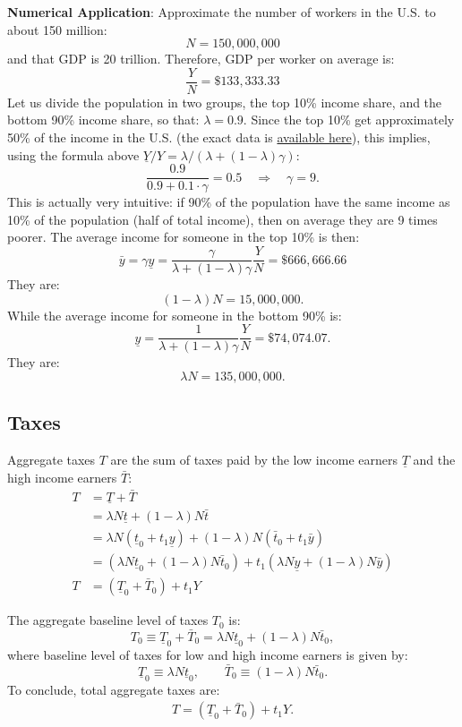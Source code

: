 \documentclass[]{book}
\begin{document}
\textbf{Numerical Application}: Approximate the number of workers in the
U.S. to about 150 million: \[N = 150,000,000\] and that GDP is 20
trillion. Therefore, GDP per worker on average is:
\[\frac{Y}{N}=\$133,333.33\] Let us divide the population in two groups,
the top 10\% income share, and the bottom 90\% income share, so that:
\(\lambda = 0.9\). Since the top 10\% get approximately 50\% of the
income in the U.S. (the exact data is
\href{https://wid.world/world/\#sptinc_p90p100_z/US;FR;DE;CN;ZA;GB;WO/last/eu/k/p/yearly/s/false/25.253500000000003/80/curve/false/country}{available
here}), this implies, using the formula above
\(\underline{Y}/Y=\lambda/\left(\lambda +(1-\lambda)\gamma\right)\):
\[\frac{0.9}{0.9+0.1\cdot \gamma}=0.5 \quad \Rightarrow \quad \gamma = 9.\]
This is actually very intuitive: if 90\% of the population have the same
income as 10\% of the population (half of total income), then on average
they are 9 times poorer. The average income for someone in the top 10\%
is then:
\[\bar{y}=\gamma\underline{y}=\frac{\gamma}{\lambda+(1-\lambda)\gamma}\frac{Y}{N}=\$666,666.66\]
They are: \[(1-\lambda) N = 15,000,000.\] While the average income for
someone in the bottom 90\% is:
\[\underline{y}=\frac{1}{\lambda+(1-\lambda)\gamma}\frac{Y}{N}=\$74,074.07.\]
They are: \[\lambda N = 135,000,000.\]

\subsection{Taxes}\label{taxes-1}

Aggregate taxes \(T\) are the sum of taxes paid by the low income
earners \(\underline{T}\) and the high income earners \(\bar{T}\): \[
\begin{aligned}
T&=\underline{T} + \bar{T}\\
&=\lambda N \underline{t} + (1-\lambda) N \bar{t} \\
&=\lambda N \left(\underline{t}_{0}+t_1\underline{y}\right) + (1-\lambda) N \left(\bar{t}_{0}+t_1\bar{y}\right)\\
&=\left(\lambda N \underline{t}_{0} + (1-\lambda) N \bar{t}_{0}\right) + t_1\left(\lambda N \underline{y} + (1-\lambda)N\bar{y} \right)\\
T&=\left(\underline{T}_{0} + \bar{T}_{0}\right) + t_1 Y
\end{aligned}
\]

The aggregate baseline level of taxes \(T_0\) is:
\[T_{0} \equiv \underline{T}_0 +  \bar{T}_0 = \lambda  N \underline{t}_0 + (1-\lambda) N \bar{t}_0,\]
where baseline level of taxes for low and high income earners is given
by:
\[\underline{T}_0\equiv\lambda  N \underline{t}_0, \qquad \bar{T}_0\equiv(1-\lambda) N \bar{t}_0.\]
To conclude, total aggregate taxes are: \[
\begin{aligned}
\boxed{T=\left(\underline{T}_{0}+\bar{T}_{0}\right)+t_1 Y}.
\end{aligned}
\]
\end{document}
